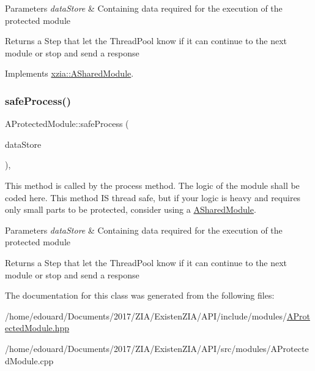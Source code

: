 \begin{DoxyParams}{Parameters}
{\em data\+Store} & Containing data required for the execution of the protected module \\
\hline
\end{DoxyParams}
\begin{DoxyReturn}{Returns}
a Step that let the Thread\+Pool know if it can continue to the next module or stop and send a response 
\end{DoxyReturn}


Implements \mbox{\hyperlink{classxzia_1_1ASharedModule_ac836fc027900a9c0dfdec35cb034a0a4}{xzia\+::\+A\+Shared\+Module}}.

\mbox{\label{classxzia_1_1AProtectedModule_a0f4b1e0c087fb98bdab0abe1e8205be0}} 
\subsubsection{\texorpdfstring{safe\+Process()}{safeProcess()}}
{\footnotesize\ttfamily A\+Protected\+Module\+::safe\+Process (\begin{DoxyParamCaption}\item[{\mbox{\hyperlink{classxzia_1_1DataStore}{Data\+Store}} \&}]{data\+Store }\end{DoxyParamCaption})\hspace{0.3cm}{\ttfamily [protected]}, {}}



This method is called by the process method. The logic of the module shall be coded here. This method IS thread safe, but if your logic is heavy and requires only small parts to be protected, consider using a \mbox{\hyperlink{classxzia_1_1ASharedModule}{A\+Shared\+Module}}. 


\begin{DoxyParams}{Parameters}
{\em data\+Store} & Containing data required for the execution of the protected module \\
\hline
\end{DoxyParams}
\begin{DoxyReturn}{Returns}
a Step that let the Thread\+Pool know if it can continue to the next module or stop and send a response 
\end{DoxyReturn}


The documentation for this class was generated from the following files\+:\begin{DoxyCompactItemize}
\item 
/home/edouard/\+Documents/2017/\+Z\+I\+A/\+Existen\+Z\+I\+A/\+A\+P\+I/include/modules/\mbox{\hyperlink{AProtectedModule_8hpp}{A\+Protected\+Module.\+hpp}}\item 
/home/edouard/\+Documents/2017/\+Z\+I\+A/\+Existen\+Z\+I\+A/\+A\+P\+I/src/modules/A\+Protected\+Module.\+cpp\end{DoxyCompactItemize}
